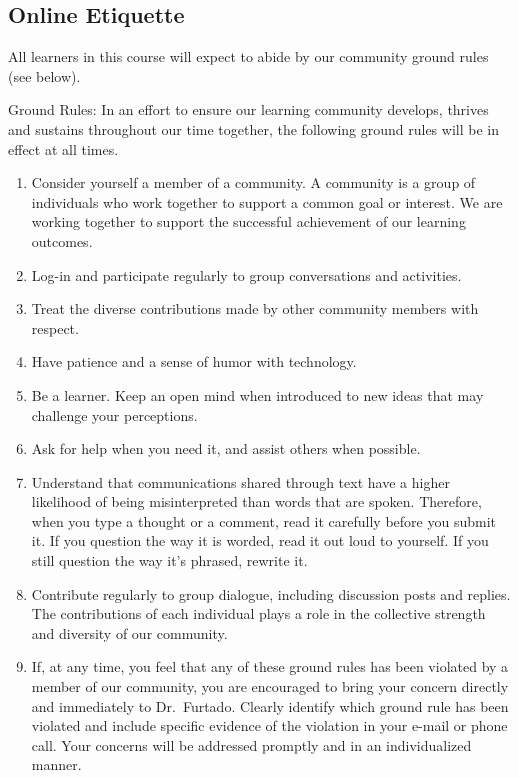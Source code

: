 \documentclass[11pt,]{article}
\providecommand{\tightlist}{%
  \setlength{\itemsep}{0pt}\setlength{\parskip}{0pt}}
\begin{document}
\hypertarget{online-etiquette}{%
\subsection{Online Etiquette}\label{online-etiquette}}

All learners in this course will expect to abide by our community ground
rules (see below).

Ground Rules: In an effort to ensure our learning community develops,
thrives and sustains throughout our time together, the following ground
rules will be in effect at all times.

\begin{enumerate}
\def\labelenumi{\arabic{enumi}.}
\tightlist
\item
  Consider yourself a member of a community. A community is a group of
  individuals who work together to support a common goal or interest. We
  are working together to support the successful achievement of our
  learning outcomes.
\item
  Log-in and participate regularly to group conversations and
  activities.
\item
  Treat the diverse contributions made by other community members with
  respect.
\item
  Have patience and a sense of humor with technology.
\item
  Be a learner. Keep an open mind when introduced to new ideas that may
  challenge your perceptions.
\item
  Ask for help when you need it, and assist others when possible.
\item
  Understand that communications shared through text have a higher
  likelihood of being misinterpreted than words that are spoken.
  Therefore, when you type a thought or a comment, read it carefully
  before you submit it. If you question the way it is worded, read it
  out loud to yourself. If you still question the way it's phrased,
  rewrite it.
\item
  Contribute regularly to group dialogue, including discussion posts and
  replies. The contributions of each individual plays a role in the
  collective strength and diversity of our community.
\item
  If, at any time, you feel that any of these ground rules has been
  violated by a member of our community, you are encouraged to bring
  your concern directly and immediately to Dr.~Furtado. Clearly identify
  which ground rule has been violated and include specific evidence of
  the violation in your e-mail or phone call. Your concerns will be
  addressed promptly and in an individualized manner.
\end{enumerate}
\end{document}
